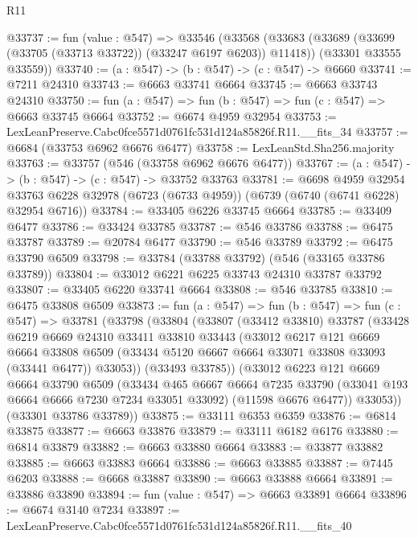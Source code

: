 \begin{lexlean}{R11}
\begin{coremodule}
@33737 := fun (value : @547) =>
  @33546
    (@33568
      (@33683 (@33689 (@33699 (@33705 (@33713 @33722)) (@33247 @6197 @6203)) @11418))
      (@33301 @33555 @33559))
@33740 := (a : @547) -> (b : @547) -> (c : @547) -> @6660
@33741 := @7211 @24310
@33743 := @6663 @33741 @6664
@33745 := @6663 @33743 @24310
@33750 := fun (a : @547) => fun (b : @547) => fun (c : @547) => @6663 @33745 @6664
@33752 := @6674 @4959 @32954
@33753 := LexLeanPreserve.Cabc0fce5571d0761fc531d124a85826f.R11.__fits_34
@33757 := @6684 (@33753 @6962 @6676 @6477)
@33758 := LexLeanStd.Sha256.majority
@33763 := @33757 (@546 (@33758 @6962 @6676 @6477))
@33767 := (a : @547) -> (b : @547) -> (c : @547) -> @33752 @33763
@33781 := @6698
    @4959
    @32954
    @33763
    @6228
    @32978
    (@6723 (@6733 @4959))
    (@6739 (@6740 (@6741 @6228) @32954 @6716))
@33784 := @33405 @6226 @33745 @6664
@33785 := @33409 @6477
@33786 := @33424 @33785
@33787 := @546 @33786
@33788 := @6475 @33787
@33789 := @20784 @6477
@33790 := @546 @33789
@33792 := @6475 @33790 @6509
@33798 := @33784 (@33788 @33792) (@546 (@33165 @33786 @33789))
@33804 := @33012 @6221 @6225 @33743 @24310 @33787 @33792
@33807 := @33405 @6220 @33741 @6664
@33808 := @546 @33785
@33810 := @6475 @33808 @6509
@33873 := fun (a : @547) =>
  fun (b : @547) =>
  fun (c : @547) =>
  @33781
    (@33798
      (@33804
        (@33807
          (@33412 @33810)
          @33787
          (@33428
            @6219
            @6669
            @24310
            @33411
            @33810
            @33443
            (@33012
              @6217
              @121
              @6669
              @6664
              @33808
              @6509
              (@33434 @5120 @6667 @6664 @33071 @33808 @33093 (@33441 @6477))
              @33053))
          (@33493 @33785))
        (@33012
          @6223
          @121
          @6669
          @6664
          @33790
          @6509
          (@33434
            @465
            @6667
            @6664
            @7235
            @33790
            (@33041 @193 @6664 @6666 @7230 @7234 @33051 @33092)
            (@11598 @6676 @6477))
          @33053))
      (@33301 @33786 @33789))
@33875 := @33111 @6353 @6359
@33876 := @6814 @33875
@33877 := @6663 @33876
@33879 := @33111 @6182 @6176
@33880 := @6814 @33879
@33882 := @6663 @33880 @6664
@33883 := @33877 @33882
@33885 := @6663 @33883 @6664
@33886 := @6663 @33885
@33887 := @7445 @6203
@33888 := @6668 @33887
@33890 := @6663 @33888 @6664
@33891 := @33886 @33890
@33894 := fun (value : @547) => @6663 @33891 @6664
@33896 := @6674 @3140 @7234
@33897 := LexLeanPreserve.Cabc0fce5571d0761fc531d124a85826f.R11.__fits_40

\end{coremodule}
\end{lexlean}
